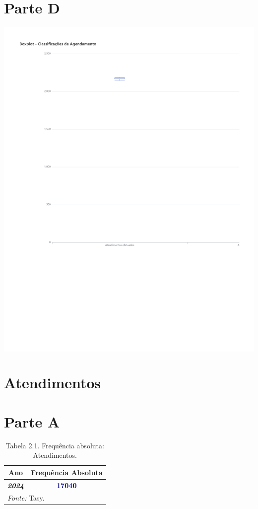 \documentclass[
  letterpaper,
  DIV=11,
  numbers=noendperiod]{scrreprt}
\begin{document}
\section{Parte D}

\includegraphics{2024_files/figure-pdf/unnamed-chunk-5-1.pdf}

\hypertarget{atendimentos}{%
\section*{Atendimentos}\label{atendimentos}}


\section{Parte A}

\begin{table}
\centering
\caption{Tabela 2.1. Frequência absoluta: Atendimentos.}
\centering
\begin{tabular}[t]{>{}c|>{}c}
\hline
Ano & Frequência Absoluta\\
\hline
\textcolor{black}{\em{\textbf{2024}}} & \textcolor{darkblue}{\textbf{17040}}\\
\hline
\multicolumn{2}{l}{\rule{0pt}{1em}\textit{Fonte: } Tasy.}\\
\end{tabular}
\end{table}
\end{document}
